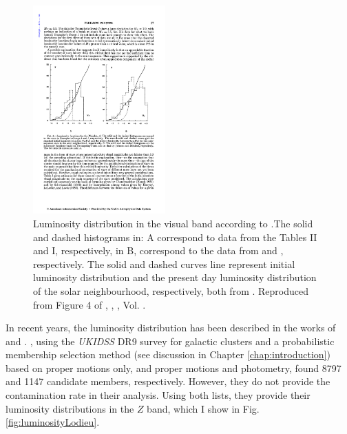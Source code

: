 \begin{figure}[ht!]
\begin{center}
\includegraphics[height=8cm]{background/Figures/F4_Limber1962.pdf}
\caption{Luminosity distribution in the visual band according to \citet{Limber1962}.The solid and dashed histograms in: A correspond to \citet{Trumpler1921} data from the Tables II and I, respectively, in B, correspond to the data from \citet{Hertzsprung1947} and \citet{Johnson1958}, respectively. The solid and dashed curves line represent initial luminosity distribution and the present day luminosity distribution of the solar neighbourhood, respectively, both from \citet{Limber1960} . Reproduced from Figure 4 of \citet{Limber1962}, \textit{}, , Vol. .}
\label{fig:luminosityLimber}
\end{center}
\end{figure}

In recent years, the luminosity distribution has been described in the works of \citet{Lodieu2012} and \citet{Bouy2015}. 
\citet{Lodieu2012}, using the \emph{UKIDSS} DR9 survey for galactic clusters and a probabilistic membership selection method (see discussion in Chapter \ref{chap:introduction}) based on proper motions only, and proper motions and photometry, found 8797 and 1147 candidate members, respectively. However, they do not provide the contamination rate in their analysis. Using both lists, they provide their luminosity distributions in the $Z$ band, which I show in Fig. \ref{fig:luminosityLodieu}.

